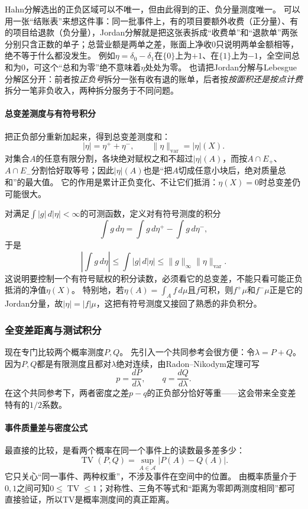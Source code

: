 Hahn分解选出的正负区域可以不唯一，但由此得到的正、负分量测度唯一。
可以用一张“结账表”来想这件事：同一批事件上，有的项目要额外收费（正分量）、有的项目给退款（负分量），Jordan分解就是把这张表拆成“收费单”和“退款单”两张分别只含正数的单子；总营业额是两单之差，账面上净收$0$只说明两单金额相等，绝不等于什么都没发生。
例如$\eta=\delta_0-\delta_1$在$\{0\}$上为$+1$、在$\{1\}$上为$-1$，全空间总和为$0$，可这个“总和为零”绝不意味着$\eta$处处为零。
也请把Jordan分解与Lebesgue分解区分开：前者按\emph{正负号}拆分一张有收有退的账单，后者按\emph{按面积还是按点计费}拆分一笔非负收入，两种拆分服务于不同问题。

\paragraph{总变差测度与有符号积分}

把正负部分重新加起来，得到总变差测度和：
\[
 |\eta|=\eta^++\eta^-,\qquad
 \|\eta\|_{\mathrm{var}}=|\eta|(X).
\]
对集合$A$的任意有限分割，各块绝对赋权之和不超过$|\eta|(A)$，而按$A\cap E_+$、$A\cap E_-$分割恰好取等号；因此$|\eta|(A)$也是“把$A$切成任意小块后，绝对质量总和”的最大值。
它的作用是累计正负变化、不让它们抵消：$\eta(X)=0$时总变差仍可能很大。

对满足$\int|g|\,d|\eta|<\infty$的可测函数，定义对有符号测度的积分
\[
 \int g\,d\eta=\int g\,d\eta^+-\int g\,d\eta^-,
\]
于是
\[
 \left|\int g\,d\eta\right|\leq\int|g|\,d|\eta|
 \leq\|g\|_\infty\|\eta\|_{\mathrm{var}}.
\]
这说明要控制一个有符号赋权的积分读数，必须看它的总变差，不能只看可能正负抵消的净值$\eta(X)$。
特别地，若$\eta(A)=\int_Af\,d\mu$且$f$可积，则$f^+\mu$和$f^-\mu$正是它的Jordan分量，故$|\eta|=|f|\mu$，这把有符号测度又接回了熟悉的非负积分。

\subsubsection{全变差距离与测试积分}

现在专门比较两个概率测度$P,Q$。
先引入一个共同参考会很方便：令$\lambda=P+Q$。
因为$P,Q$都是有限测度且都对$\lambda$绝对连续，由Radon–Nikodym定理可写
\[
 p=\frac{dP}{d\lambda},\qquad q=\frac{dQ}{d\lambda}.
\]
在这个共同参考下，两者密度之差$p-q$的正负部分恰好等重——这会带来全变差特有的$1/2$系数。

\paragraph{事件质量差与密度公式}

最直接的比较，是看两个概率在同一个事件上的读数最多差多少：
\[
 \operatorname{TV}(P,Q)=\sup_{A\in\mathcal A}|P(A)-Q(A)|.
\]
它只关心“同一事件、两种权重”，不涉及事件在空间中的位置。
由概率质量介于$0,1$之间可知$0\leq\operatorname{TV}\leq1$；对称性、三角不等式和“距离为零即两测度相同”都可直接验证，所以TV是概率测度间的真正距离。

